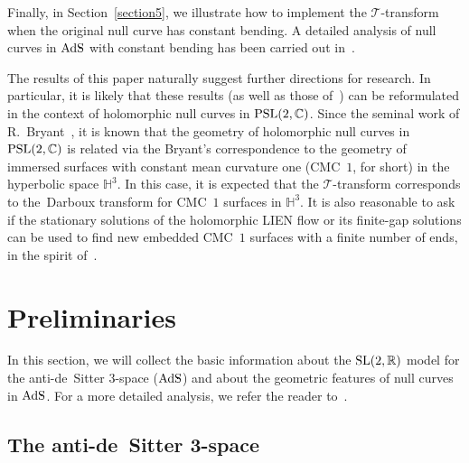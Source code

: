 \documentclass[pdftex]{sigma}
\numberwithin{equation}{section}
\def\R{\mathbb{R}}
\def\SL{{\rm SL}(2,\R)}
\def\PSL{{\rm PSL}(2,\mathbb{C})}
\def\AdS{{\rm AdS}}
\begin{document}
Finally, in Section~\ref{section5}, we illustrate how to implement the $\mathcal{T}$-transform when the original null curve has constant bending. A detailed analysis of null curves in $\AdS$ with constant bending has been carried out in~\cite{MP}.

The results of this paper naturally suggest further directions for research. In particular, it is likely that these results (as well as those of~\cite{MP}) can be reformulated in the context of holomorphic null curves in $\PSL$. Since the seminal work of R.~Bryant~\cite{Br1}, it is known that the geometry of holomorphic null curves \cite{Br2,MN3} in $\PSL$ is related via the Bryant's correspondence to the geometry of immersed surfaces with constant mean curvature one (CMC~$1$, for short) in the hyperbolic space $\mathbb{H}^3$. In this case, it is expected that the $\mathcal{T}$-transform corresponds to the~Darboux transform for CMC~$1$ surfaces in $\mathbb{H}^3$. It is also reasonable to ask if the stationary solutions of the holomorphic LIEN flow or its finite-gap solutions can be used to find new embedded CMC~$1$ surfaces with a finite number of ends, in the spirit of~\cite{BPS}.

\section{Preliminaries}\label{section2}

In this section, we will collect the basic information about the $\SL$ model for the anti-de~Sitter $3$-space ($\AdS$) and about the geometric features of null curves in $\AdS$. For a more detailed analysis, we refer the reader to~\cite[Sections 2 and 3]{MP}.

\subsection{The anti-de~Sitter 3-space}
\end{document}
